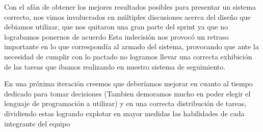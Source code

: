 Con el afán de obtener los mejores resultados posibles para presentar un sistema correcto, nos vimos involucrados en múltiples discusiones acerca del diseño que debiamos utilizar, que nos quitaron una gran parte del sprint ya que no lograbamos ponernos de acuerdo
Esta indecisión nos provocó un retraso importante en lo que correspondía al armado del sistema, provocando que ante la necesidad de cumplir con lo pactado no logramos llevar una correcta exhibición de las tareas que ibamos realizando en nuestro sistema de seguimiento.

En una próxima iteración creemos que deberíamos mejorar en cuanto al tiempo dedicado para tomar decisiones (Tambien demoramos mucho en poder elegir el lenguaje de programación a utilizar) y en una correcta distribución de tareas, dividiendo estas logrando explotar en mayor medidas las habilidades de cada integrante del equipo
